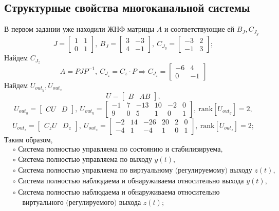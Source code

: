 \documentclass[a4paper, 12pt]{article}
\begin{document}
    \subsection{Структурные свойства многоканальной системы}
    В первом задании уже находили ЖНФ матрицы $A$ и соответствующие ей $B_J,C_{J_y}$
    $$
    J=\begin{bmatrix}
        1     &1\\
     0     &1
    \end{bmatrix},\ B_J=\begin{bmatrix}
        3    &-3\\
     4    &-1
    \end{bmatrix},\ C_{J_y}=\begin{bmatrix}
        -3     &2\\
    -1     &3
    \end{bmatrix};
    $$
    Найдем $C_{J_z}$
    $$
    A=PJP^{-1},\ C_{J_z}=C_z\cdot P\Rightarrow C_{J_z}=\begin{bmatrix}
        -6     &4\\
     0    &-1
    \end{bmatrix}
    $$
    Найдем $U_{out_y},U_{out_z}$
    $$
    U=\begin{bmatrix}
        B &AB
    \end{bmatrix},
    $$
    $$
    U_{out_y}=\begin{bmatrix}
        CU &D
    \end{bmatrix},\
    U_{out_y}=\begin{bmatrix}
     -1    &7   &-13   &10    &-2     &0\\
     9   &0    &5    &1    & 0     &1
    \end{bmatrix},\ \text{rank}\left[ U_{out_y} \right]=2,
    $$
    $$
    U_{out_z}=\begin{bmatrix}
        C_zU &D_z
    \end{bmatrix},\
    U_{out_z}=\begin{bmatrix}
     -2    &14   &-26    &20     &2     &0\\
    -4     &1    &-4     &1     &0     &1
    \end{bmatrix},\ \text{rank}\left[ U_{out_z} \right]=2;
    $$
    Таким образом,
    \begin{align*}
        &\circ \text{ Система полностью управляема по состоянию и стабилизируема},\\
        &\circ \text{ Система полностью управляема по выходу } y(t),\\
        &\circ \text{ Система полностью управляема по виртуальному (регулируемому) выходу } z(t),\\
        &\circ \text{ Система полностью наблюдаема и обнаруживаема относительно выхода } y(t),\\
        &\circ \text{ Система полностью наблюдаема и обнаруживаема относительно}\\
        &\,\,\,\,\,\,\text{ виртуального (регулируемого) выхода } z(t);
    \end{align*}
\end{document}
